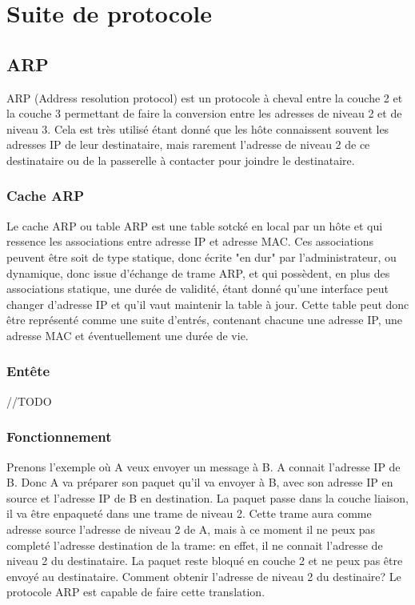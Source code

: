 \section{Suite de protocole}

\subsection{ARP} ARP (Address resolution protocol) est un protocole à cheval
entre la couche 2 et la couche 3 permettant de faire la conversion entre les
adresses de niveau 2 et de niveau 3.  Cela est très utilisé étant donné que les
hôte connaissent souvent les adresses IP de leur destinataire, mais rarement
l'adresse de niveau 2 de ce destinataire ou de la passerelle à contacter pour
joindre le destinataire.

\subsubsection{Cache ARP} Le cache ARP ou table ARP est une table sotcké en
local par un hôte et qui ressence les associations entre adresse IP et adresse
MAC.  Ces associations peuvent être soit de type statique, donc écrite "en dur"
par l'administrateur, ou dynamique, donc issue d'échange de trame ARP, et qui
possèdent, en plus des associations statique, une durée de validité, étant
donné qu'une interface peut changer d'adresse IP et qu'il vaut maintenir la
table à jour.  Cette table peut donc être représenté comme une suite d'entrés,
contenant chacune une adresse IP, une adresse MAC et éventuellement une durée
de vie.

\subsubsection{Entête}
//TODO


\subsubsection{Fonctionnement} Prenons l'exemple où A veux envoyer un message à
B. A connait l'adresse IP de B. Donc A va préparer son paquet qu'il va envoyer
à B, avec son adresse IP en source et l'adresse IP de B en destination. La
paquet passe dans la couche liaison, il va être enpaqueté dans une trame de
niveau 2. Cette trame aura comme adresse source l'adresse de niveau 2 de A,
mais à ce moment il ne peux pas completé l'adresse destination de la trame: en
effet, il ne connait l'adresse de niveau 2 du destinataire. La paquet reste
bloqué en couche 2 et ne peux pas être envoyé au destinataire. Comment obtenir
l'adresse de niveau 2 du destinaire?  Le protocole ARP est capable de faire
cette translation.

